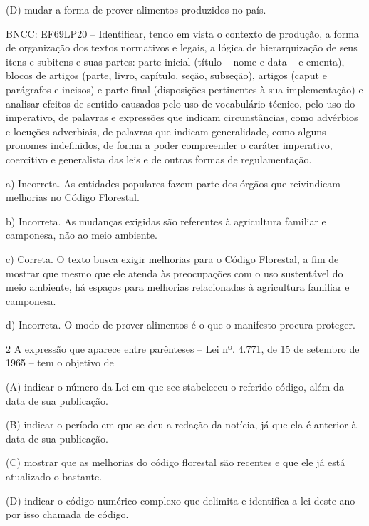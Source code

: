 \begin{itemize}
\begin{itemize}
{\begin{itemize}
\begin{itemize}
\begin{escolha}
\begin{escolha}
\begin{escolha}
\begin{escolha}
\begin{escolha}
(D) mudar a forma de prover alimentos produzidos no país.

BNCC: EF69LP20 -- Identificar, tendo em vista o contexto de produção, a
forma de organização dos textos normativos e legais, a lógica de
hierarquização de seus itens e subitens e suas partes: parte inicial
(título -- nome e data -- e ementa), blocos de artigos (parte, livro,
capítulo, seção, subseção), artigos (caput e parágrafos e incisos) e
parte final (disposições pertinentes à sua implementação) e analisar
efeitos de sentido causados pelo uso de vocabulário técnico, pelo uso do
imperativo, de palavras e expressões que indicam circunstâncias, como
advérbios e locuções adverbiais, de palavras que indicam generalidade,
como alguns pronomes indefinidos, de forma a poder compreender o caráter
imperativo, coercitivo e generalista das leis e de outras formas de
regulamentação.

a) Incorreta. As entidades populares fazem parte dos órgãos que
reivindicam melhorias no Código Florestal.

b) Incorreta. As mudanças exigidas são referentes à agricultura familiar
e camponesa, não ao meio ambiente.

c) Correta. O texto busca exigir melhorias para o Código Florestal, a
fim de mostrar que mesmo que ele atenda às preocupações com o uso
sustentável do meio ambiente, há espaços para melhorias relacionadas à
agricultura familiar e camponesa.

d) Incorreta. O modo de prover alimentos é o que o manifesto procura
proteger.

\num{2} A expressão que aparece entre parênteses -- Lei nº. 4.771, de 15
de setembro de 1965 -- tem o objetivo de

(A) indicar o número da Lei em que see stabeleceu o referido código,
além da data de sua publicação.

(B) indicar o período em que se deu a redação da notícia, já que ela é
anterior à data de sua publicação.

(C) mostrar que as melhorias do código florestal são recentes e que ele
já está atualizado o bastante.

(D) indicar o código numérico complexo que delimita e identifica a lei
deste ano -- por isso chamada de código.


\end{escolha}
\end{escolha}
\end{escolha}
\end{escolha}
\end{escolha}
\end{itemize}
\end{itemize}}
\end{itemize}
\end{itemize}

